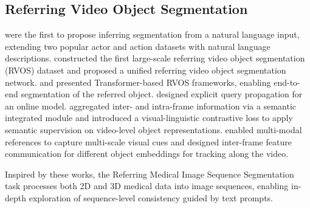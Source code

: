 
\subsection{Referring Video Object Segmentation}
\citet{gavrilyuk2018actor} were the first to propose inferring segmentation from a natural language input, extending two popular actor and action datasets with natural language descriptions.
\citet{seo2020urvos} constructed the first large-scale referring video object segmentation (RVOS) dataset and proposed a unified referring video object segmentation network.
\citet{wu2022referformer} and \citet{botach2022mttr} presented Transformer-based RVOS frameworks, enabling end-to-end segmentation of the referred object.
\citet{wu2023onlinerefer} designed explicit query propagation for an online model. 
\citet{luo2024soc} aggregated inter- and intra-frame information via a semantic integrated module and introduced a visual-linguistic contrastive loss to apply semantic supervision on video-level object representations.
\citet{yan2024referred} enabled multi-modal references to capture multi-scale visual cues and designed inter-frame feature communication for different object embeddings for tracking along the video.

Inspired by these works, the Referring Medical Image Sequence Segmentation task processes both 2D and 3D medical data into image sequences, enabling in-depth exploration of sequence-level consistency guided by text prompts.